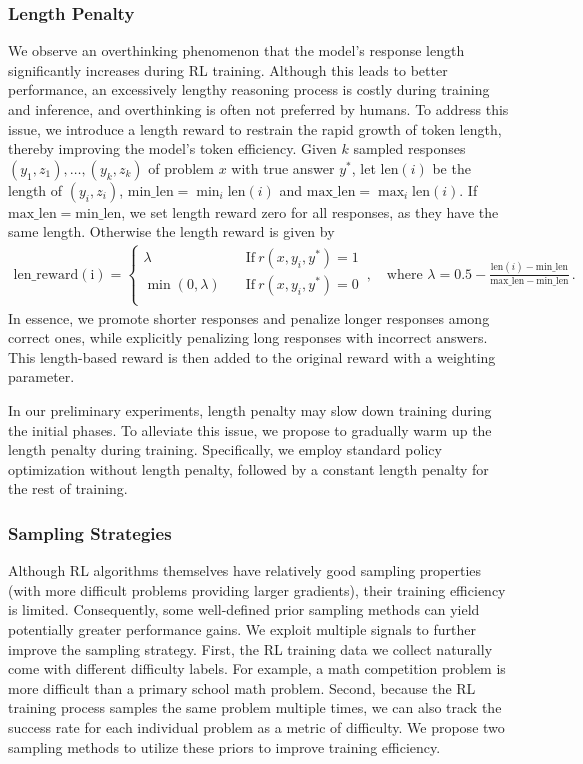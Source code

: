 \documentclass{article}
\begin{document}
\subsubsection{Length Penalty}
\label{sec:lengthpenalty}
We observe an overthinking phenomenon that the model's response length significantly increases during RL training. 
Although this leads to better performance, an excessively lengthy reasoning process is costly during training and inference, and overthinking is often not preferred by humans.
To address this issue, we introduce a length reward to restrain the rapid growth of token length, thereby improving the model's token efficiency. 
Given $k$ sampled responses $(y_1, z_1),\dots,(y_k,z_k)$ of problem $x$ with true answer $y^*$, let $\mathrm{len}(i)$ be the length of $(y_i, z_i)$, $\mathrm{min\_len}=\min_i \mathrm{len}(i)$ and $\mathrm{max\_len}=\max_i \mathrm{len}(i)$. 
If $\mathrm{max\_len}=\mathrm{min\_len}$, we set length reward zero for all responses, as they have the same length. Otherwise the length reward is given by
\begin{align*}
\mathrm{len\_reward(i)} = 
\left\{
\begin{aligned}
\lambda & \quad \text{If}\ r(x, y_i, y^*) = 1 \\
\min(0, \lambda )& \quad \text{If}\ r(x, y_i, y^*) = 0\\
\end{aligned}
\right.\, ,\quad
\text{where } \lambda  = 0.5 - \frac{\mathrm{len}(i) - \mathrm{min\_len}}{\mathrm{max\_len} - \mathrm{min\_len}} \, .
\end{align*}
In essence, we promote shorter responses and penalize longer responses among correct ones, while explicitly penalizing long responses with incorrect answers. 
This length-based reward is then added to the original reward with a weighting parameter.

In our preliminary experiments, length penalty may slow down training during the initial phases. To alleviate this issue, we propose to gradually warm up the length penalty during training. Specifically, we employ standard policy optimization without length penalty, followed by a constant length penalty for the rest of training.

\subsubsection{Sampling Strategies}
\label{sec:sampling}

Although RL algorithms themselves have relatively good sampling properties (with more difficult problems providing larger gradients), their training efficiency is limited. Consequently, some well-defined prior sampling methods can yield potentially greater performance gains.
We exploit multiple signals to further improve the sampling strategy.
First, the RL training data we collect naturally come with different difficulty labels. For example, a math competition problem is more difficult than a primary school math problem.
Second, because the RL training process samples the same problem multiple times, we can also track the success rate for each individual problem as a metric of difficulty.
We propose two sampling methods to utilize these priors to improve training efficiency.
\end{document}
